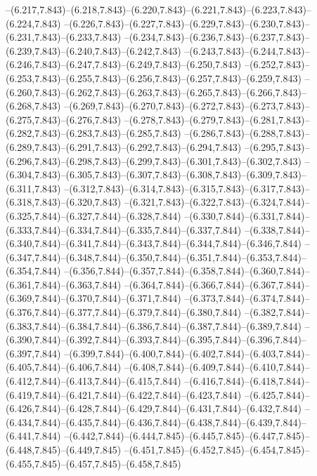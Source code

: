   --(6.217,7.843)--(6.218,7.843)--(6.220,7.843)--(6.221,7.843)--(6.223,7.843)--(6.224,7.843)%
  --(6.226,7.843)--(6.227,7.843)--(6.229,7.843)--(6.230,7.843)--(6.231,7.843)--(6.233,7.843)%
  --(6.234,7.843)--(6.236,7.843)--(6.237,7.843)--(6.239,7.843)--(6.240,7.843)--(6.242,7.843)%
  --(6.243,7.843)--(6.244,7.843)--(6.246,7.843)--(6.247,7.843)--(6.249,7.843)--(6.250,7.843)%
  --(6.252,7.843)--(6.253,7.843)--(6.255,7.843)--(6.256,7.843)--(6.257,7.843)--(6.259,7.843)%
  --(6.260,7.843)--(6.262,7.843)--(6.263,7.843)--(6.265,7.843)--(6.266,7.843)--(6.268,7.843)%
  --(6.269,7.843)--(6.270,7.843)--(6.272,7.843)--(6.273,7.843)--(6.275,7.843)--(6.276,7.843)%
  --(6.278,7.843)--(6.279,7.843)--(6.281,7.843)--(6.282,7.843)--(6.283,7.843)--(6.285,7.843)%
  --(6.286,7.843)--(6.288,7.843)--(6.289,7.843)--(6.291,7.843)--(6.292,7.843)--(6.294,7.843)%
  --(6.295,7.843)--(6.296,7.843)--(6.298,7.843)--(6.299,7.843)--(6.301,7.843)--(6.302,7.843)%
  --(6.304,7.843)--(6.305,7.843)--(6.307,7.843)--(6.308,7.843)--(6.309,7.843)--(6.311,7.843)%
  --(6.312,7.843)--(6.314,7.843)--(6.315,7.843)--(6.317,7.843)--(6.318,7.843)--(6.320,7.843)%
  --(6.321,7.843)--(6.322,7.843)--(6.324,7.844)--(6.325,7.844)--(6.327,7.844)--(6.328,7.844)%
  --(6.330,7.844)--(6.331,7.844)--(6.333,7.844)--(6.334,7.844)--(6.335,7.844)--(6.337,7.844)%
  --(6.338,7.844)--(6.340,7.844)--(6.341,7.844)--(6.343,7.844)--(6.344,7.844)--(6.346,7.844)%
  --(6.347,7.844)--(6.348,7.844)--(6.350,7.844)--(6.351,7.844)--(6.353,7.844)--(6.354,7.844)%
  --(6.356,7.844)--(6.357,7.844)--(6.358,7.844)--(6.360,7.844)--(6.361,7.844)--(6.363,7.844)%
  --(6.364,7.844)--(6.366,7.844)--(6.367,7.844)--(6.369,7.844)--(6.370,7.844)--(6.371,7.844)%
  --(6.373,7.844)--(6.374,7.844)--(6.376,7.844)--(6.377,7.844)--(6.379,7.844)--(6.380,7.844)%
  --(6.382,7.844)--(6.383,7.844)--(6.384,7.844)--(6.386,7.844)--(6.387,7.844)--(6.389,7.844)%
  --(6.390,7.844)--(6.392,7.844)--(6.393,7.844)--(6.395,7.844)--(6.396,7.844)--(6.397,7.844)%
  --(6.399,7.844)--(6.400,7.844)--(6.402,7.844)--(6.403,7.844)--(6.405,7.844)--(6.406,7.844)%
  --(6.408,7.844)--(6.409,7.844)--(6.410,7.844)--(6.412,7.844)--(6.413,7.844)--(6.415,7.844)%
  --(6.416,7.844)--(6.418,7.844)--(6.419,7.844)--(6.421,7.844)--(6.422,7.844)--(6.423,7.844)%
  --(6.425,7.844)--(6.426,7.844)--(6.428,7.844)--(6.429,7.844)--(6.431,7.844)--(6.432,7.844)%
  --(6.434,7.844)--(6.435,7.844)--(6.436,7.844)--(6.438,7.844)--(6.439,7.844)--(6.441,7.844)%
  --(6.442,7.844)--(6.444,7.845)--(6.445,7.845)--(6.447,7.845)--(6.448,7.845)--(6.449,7.845)%
  --(6.451,7.845)--(6.452,7.845)--(6.454,7.845)--(6.455,7.845)--(6.457,7.845)--(6.458,7.845)%
